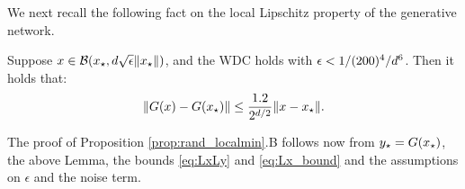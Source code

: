 We next recall the following fact on the local Lipschitz property of the generative network.

\begin{lemma}
	Suppose $x \in \mathcal{B}({x_{\star}}, d \sqrt{\epsilon} \|{x_{\star}}\|)$, and the WDC holds with $\epsilon < 1/(200)^4 /d^6$. Then it holds that:
	\[
	\|G(x) - G({x_{\star}}) \|\leq \frac{1.2}{2^{d/2}} \|x - {x_{\star}}\|.
	\]
\end{lemma}

The proof of Proposition \ref{prop:rand_localmin}.B follows now from ${{y_\star}} = G({x_{\star}})$, the above Lemma, the bounds \eqref{eq:LxLy} and \eqref{eq:Lx_bound} and the assumptions on $\epsilon$ and the noise term.